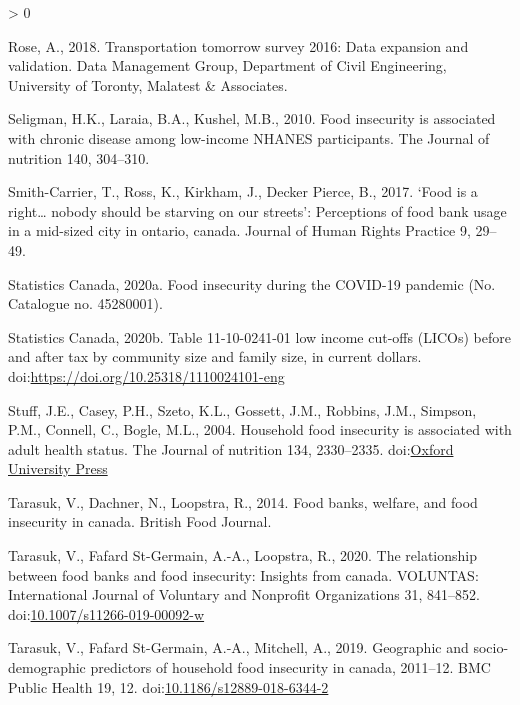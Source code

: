 \documentclass[]{elsarticle} %
\newlength{\cslhangindent}
\newenvironment{CSLReferences}[2] %
 {%
  \setlength{\parindent}{0pt}
  \ifodd #1 \everypar{\setlength{\hangindent}{\cslhangindent}}\ignorespaces\fi
  \ifnum #2 > 0
  \setlength{\parskip}{#2\baselineskip}
  \fi
 }%
 {}
\begin{document}
\begin{CSLReferences}{1}{0}
\leavevmode\hypertarget{ref-rose2018transportation}{}%
Rose, A., 2018. Transportation tomorrow survey 2016: Data expansion and
validation. Data Management Group, Department of Civil Engineering,
University of Toronty, Malatest \& Associates.

\leavevmode\hypertarget{ref-seligman2010food}{}%
Seligman, H.K., Laraia, B.A., Kushel, M.B., 2010. Food insecurity is
associated with chronic disease among low-income NHANES participants.
The Journal of nutrition 140, 304--310.

\leavevmode\hypertarget{ref-smith2017food}{}%
Smith-Carrier, T., Ross, K., Kirkham, J., Decker Pierce, B., 2017.
{`Food is a right\ldots{} nobody should be starving on our streets'}:
Perceptions of food bank usage in a mid-sized city in ontario, canada.
Journal of Human Rights Practice 9, 29--49.

\leavevmode\hypertarget{ref-statisticscanada2020food}{}%
Statistics Canada, 2020a. Food insecurity during the COVID-19 pandemic
(No. Catalogue no. 45280001).

\leavevmode\hypertarget{ref-statisticscanada2020licos}{}%
Statistics Canada, 2020b. Table 11-10-0241-01 low income cut-offs
(LICOs) before and after tax by community size and family size, in
current dollars. doi:\url{https://doi.org/10.25318/1110024101-eng}

\leavevmode\hypertarget{ref-stuff2004household}{}%
Stuff, J.E., Casey, P.H., Szeto, K.L., Gossett, J.M., Robbins, J.M.,
Simpson, P.M., Connell, C., Bogle, M.L., 2004. Household food insecurity
is associated with adult health status. The Journal of nutrition 134,
2330--2335.
doi:\href{https://doi.org/Oxford\%20University\%20Press}{Oxford University Press}

\leavevmode\hypertarget{ref-tarasuk2014food}{}%
Tarasuk, V., Dachner, N., Loopstra, R., 2014. Food banks, welfare, and
food insecurity in canada. British Food Journal.

\leavevmode\hypertarget{ref-tarasuk2020relationship}{}%
Tarasuk, V., Fafard St-Germain, A.-A., Loopstra, R., 2020. The
relationship between food banks and food insecurity: Insights from
canada. VOLUNTAS: International Journal of Voluntary and Nonprofit
Organizations 31, 841--852.
doi:\href{https://doi.org/10.1007/s11266-019-00092-w}{10.1007/s11266-019-00092-w}

\leavevmode\hypertarget{ref-tarasuk2019geographic}{}%
Tarasuk, V., Fafard St-Germain, A.-A., Mitchell, A., 2019. Geographic
and socio-demographic predictors of household food insecurity in canada,
2011--12. BMC Public Health 19, 12.
doi:\href{https://doi.org/10.1186/s12889-018-6344-2}{10.1186/s12889-018-6344-2}


\end{CSLReferences}
\end{document}
